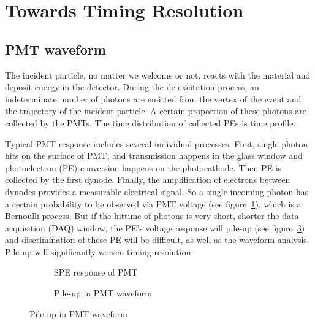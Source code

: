 \section{Towards Timing Resolution} %
\label{sec:toyMC}

\subsection{PMT waveform}

The incident particle, no matter we welcome or not, reacts with the material and deposit energy in the detector. During the de-excitation process, an indeterminate number of photons are emitted from the vertex of the event and the trajectory of the incident particle. A certain proportion of these photons are collected by the PMTs. The time distribution of collected PEs is time profile. 

Typical PMT response includes several individual processes. First, single photon hits on the surface of PMT, and transmission happens in the glass window and photoelectron (PE) conversion happens on the photocathode. Then PE is collected by the first dynode. Finally, the amplification of electrons between dynodes provides a measurable electrical signal. So a single incoming photon has a certain probability to be observed via PMT voltage (see figure~\ref{fig:spe}), which is a Bernoulli process. But if the hittime of photons is very short, shorter the data acquisition (DAQ) window, the PE's voltage response will pile-up (see figure~\ref{fig:pile}) and discrimination of these PE will be difficult, as well as the waveform analysis. Pile-up will significantly worsen timing resolution. 

\begin{figure}[H]
\begin{minipage}[b]{.5\textwidth}
\begin{figure}[H]
    \centering
    \resizebox{\textwidth}{!}{}
    \caption{\label{fig:spe} SPE response of PMT}
\end{figure}
\end{minipage}
\begin{minipage}[b]{.5\textwidth}
\begin{figure}[H]
    \centering
    \resizebox{\textwidth}{!}{}
    \caption{\label{fig:pile} Pile-up in PMT waveform}
\end{figure}
\end{minipage}
\end{figure}

